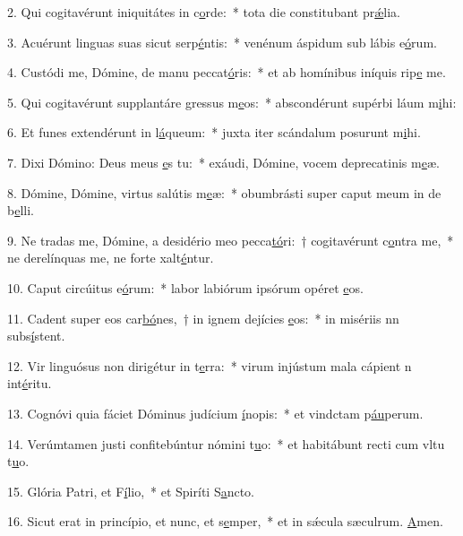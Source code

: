2. Qui cogitavérunt iniquitátes in c\uline{o}rde:~* tota die constitubant pr\uline{ǽ}lia.\par 
3. Acuérunt linguas suas sicut serp\uline{é}ntis:~* venénum áspidum sub lábis e\uline{ó}rum.\par 
4. Custódi me, Dómine, de manu peccat\uline{ó}ris:~* et ab homínibus iníquis rip\uline{e} me.\par 
5. Qui cogitavérunt supplantáre gressus m\uline{e}os:~* abscondérunt supérbi láum m\uline{i}hi:\par 
6. Et funes extendérunt in l\uline{á}queum:~* juxta iter scándalum posurunt m\uline{i}hi.\par 
7. Dixi Dómino: Deus meus \uline{e}s tu:~* exáudi, Dómine, vocem deprecatinis m\uline{e}æ.\par 
8. Dómine, Dómine, virtus salútis m\uline{e}æ:~* obumbrásti super caput meum in de b\uline{e}lli.\par 
9. Ne tradas me, Dómine, a desidério meo pecca\uline{tó}ri:~† cogitavérunt c\uline{o}ntra me,~* ne derelínquas me, ne forte xalt\uline{é}ntur.\par 
10. Caput circúitus e\uline{ó}rum:~* labor labiórum ipsórum opéret \uline{e}os.\par 
11. Cadent super eos car\uline{bó}nes,~† in ignem dejícies \uline{e}os:~* in misériis nn subs\uline{í}stent.\par 
12. Vir linguósus non dirigétur in t\uline{e}rra:~* virum injústum mala cápient n int\uline{é}ritu.\par 
13. Cognóvi quia fáciet Dóminus judícium \uline{í}nopis:~* et vindctam p\uline{áu}perum.\par 
14. Verúmtamen justi confitebúntur nómini t\uline{u}o:~* et habitábunt recti cum vltu t\uline{u}o.\par 
15. Glória Patri, et F\uline{í}lio,~* et Spiríti S\uline{a}ncto.\par 
16. Sicut erat in princípio, et nunc, et s\uline{e}mper,~* et in sǽcula sæculrum. \uline{A}men.\par 

